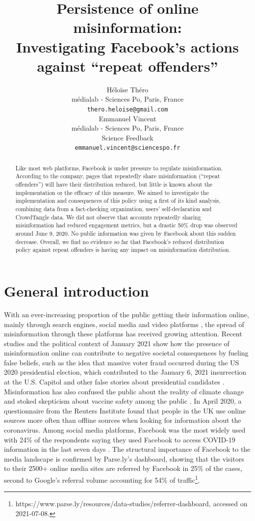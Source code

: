 \documentclass[11pt,a4paper]{article}
\title{Persistence of online misinformation: \\ Investigating Facebook's actions against ``repeat offenders''}
\author{Héloïse Théro \\
  médialab - Sciences Po, Paris, France \\
  \texttt{thero.heloise@gmail.com} \\\And
  Emmanuel Vincent \\
  médialab - Sciences Po, Paris, France \\
  Science Feedback \\
  \texttt{emmanuel.vincent@sciencespo.fr} \\}
\date{}
\begin{document}
\maketitle

\begin{abstract}
Like most web platforms, Facebook is under pressure to regulate misinformation. 
According to the company, pages that repeatedly share misinformation (“repeat offenders”) will have their distribution reduced, but little is known about the implementation or the efficacy of this measure. 
We aimed to investigate the implementation and consequences of this policy using a first of its kind analysis, combining data from a fact-checking organization, users’ self-declaration and CrowdTangle data. 
We did not observe that accounts repeatedly sharing misinformation had reduced engagement metrics, but a drastic 50\% drop was observed around June 9, 2020. 
No public information was given by Facebook about this sudden decrease. 
Overall, we find no evidence so far that Facebook’s reduced distribution policy against repeat offenders is having any impact on misinformation distribution.
\end{abstract}

\section{General introduction}

With an ever-increasing proportion of the public getting their information online, mainly through search engines, social media and video platforms \citep{mitchell2016modern}, the spread of misinformation through these platforms has received growing attention. 
Recent studies and the political context of January 2021 show how the presence of misinformation online can contribute to negative societal consequences by fueling false beliefs, such as the idea that massive voter fraud occurred during the US 2020 presidential election, which contributed to the January 6, 2021 insurrection at the U.S. Capitol \citep{benkler2020mail} and other false stories about presidential candidates \citep{allcott2017social}. 
Misinformation has also confused the public about the reality of climate change \citep{brulle30years, porter2019can} and stoked skepticism about vaccine safety among the public \citep{featherstone2020feeling, lahouati2020spread}. 
In April 2020, a questionnaire from the Reuters Institute found that people in the UK use online sources more often than offline sources when looking for information about the coronavirus. 
Among social media platforms, Facebook was the most widely used with 24\% of the respondents saying they used Facebook to access COVID-19 information in the last seven days \citep{fletcher2020information}. 
The structural importance of Facebook to the media landscape is confirmed by Parse.ly’s dashboard, showing that the visitors to their 2500+ online media sites are referred by Facebook in 25\% of the cases, second to Google’s referral volume accounting for 54\% of traffic\footnote{https://www.parse.ly/resources/data-studies/referrer-dashboard, accessed on 2021-07-08.}.
\end{document}
